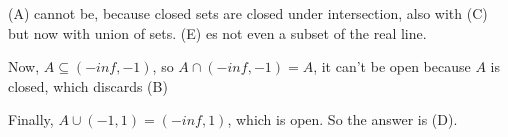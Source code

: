 \documentclass[12pt]{report}
\newcounter{it}
\theoremstyle{largebreak}
\begin{document}
    \begin{sol}
        (A) cannot be, because closed sets are closed under intersection, also with (C) but now with union of sets. (E) es not even a subset of the real line.

        Now, $A\subseteq (-inf,-1)$, so $A\cap(-inf,-1)=A$, it can't be open because $A$ is closed, which discards (B)

        Finally, $A\cup(-1,1)=(-inf,1)$, which is open. So the answer is (D).
    \end{sol}
\end{document}
